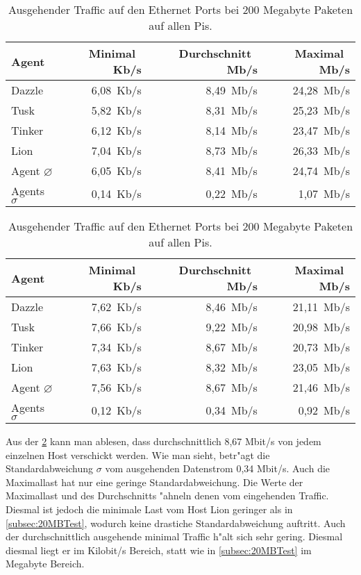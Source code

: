 \begin{table}
\centering
\begin{tabular}{l%
 r<{\,Kb/s}%
 r<{\,Mb/s}%
 r<{\,Mb/s}%
}
Agent  				& Minimal		& Durchschnitt		& Maximal	\\
\hline
Dazzle 				& 6,08			& 8,49 			& 24,28		\\
Tusk 				& 5,82			& 8,31			& 25,23		\\
Tinker				& 6,12			& 8,14			& 23,47		\\
Lion				& 7,04			& 8,73			& 26,33		\\ 
Agent $\diameter $	 	& 6,05			& 8,41			& 24,74		\\   
Agents $\sigma $		& 0,14			& 0,22			& 1,07		\\

\end{tabular}
\caption{Eingehender Traffic auf den Ethernet Ports bei 200 Megabyte Paketen auf allen Pis.}
\label{tab:EingehenderTraffic200Mb}
\begin{tabular}{l%
 r<{\,Kb/s}%
 r<{\,Mb/s}%
 r<{\,Mb/s}%
}
Agent  				& Minimal		& Durchschnitt		& Maximal	\\	
\hline
Dazzle 				& 7,62			& 8,46	 		& 21,11		\\
Tusk 				& 7,66			& 9,22			& 20,98		\\
Tinker				& 7,34			& 8,67			& 20,73		\\
Lion				& 7,63			& 8,32			& 23,05		\\ 
Agent $\diameter $	 	& 7,56			& 8,67			& 21,46		\\   
Agents $\sigma $		& 0,12			& 0,34			& 0,92		\\

\end{tabular}
\caption{Ausgehender Traffic auf den Ethernet Ports bei 200 Megabyte Paketen auf allen Pis.}
\label{tab:AusgehenderTraffic200Mb}

\end{table}

Aus der \cref{tab:AusgehenderTraffic200Mb} kann man ablesen, dass durchschnittlich %
8,67 Mbit/s von jedem einzelnen Host verschickt werden. Wie man sieht, betr"agt die Standardabweichung %
$\sigma$ vom ausgehenden Datenstrom 0,34 Mbit/s. Auch die Maximallast hat nur eine geringe Standardabweichung. %
Die Werte der Maximallast und des Durchschnitts "ahneln denen vom eingehenden Traffic. %
Diesmal ist jedoch die minimale Last vom Host Lion geringer als in \cref{subsec:20MBTest}, %
wodurch keine drastiche Standardabweichung auftritt. Auch der durchschnittlich ausgehende %
minimal Traffic h"alt sich sehr gering. Diesmal diesmal liegt er im Kilobit/s Bereich, statt wie in \cref{subsec:20MBTest} %
im Megabyte Bereich. %



